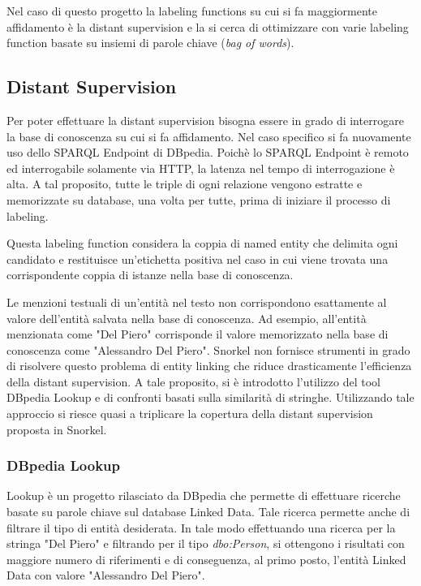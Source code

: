 Nel caso di questo progetto la labeling functions su cui si fa maggiormente affidamento è la distant supervision e la si cerca di ottimizzare con varie labeling function basate su insiemi di parole chiave (\textit{bag of words}).

\subsection{Distant Supervision}
\label{sec:methods:labelling:distant_supervision}
Per poter effettuare la distant supervision bisogna essere in grado di interrogare la base di conoscenza su cui si fa affidamento. Nel caso specifico si fa nuovamente uso dello SPARQL Endpoint di DBpedia. Poichè lo SPARQL Endpoint è remoto ed interrogabile solamente via HTTP, la latenza nel tempo di interrogazione è alta. A tal proposito, tutte le triple di ogni relazione vengono estratte e memorizzate su database, una volta per tutte, prima di iniziare il processo di labeling.

Questa labeling function considera la coppia di named entity che delimita ogni candidato e restituisce un'etichetta positiva nel caso in cui viene trovata una corrispondente coppia di istanze nella base di conoscenza. 

Le menzioni testuali di un'entità nel testo non corrispondono esattamente al valore dell'entità salvata nella base di conoscenza. Ad esempio, all'entità menzionata come "Del Piero" corrisponde il valore memorizzato nella base di conoscenza come "Alessandro Del Piero". Snorkel non fornisce strumenti in grado di risolvere questo problema di entity linking che riduce drasticamente l'efficienza della distant supervision. A tale proposito, si è introdotto l'utilizzo del tool DBpedia Lookup e di confronti basati sulla similarità di stringhe. Utilizzando tale approccio si riesce quasi a triplicare la copertura della distant supervision proposta in Snorkel.

\subsubsection{DBpedia Lookup}
\label{sec:methods:labelling:distant_supervision:lookup}

Lookup è un progetto rilasciato da DBpedia che permette di effettuare ricerche basate su parole chiave sul database Linked Data. Tale ricerca permette anche di filtrare il tipo di entità desiderata. In tale modo effettuando una ricerca per la stringa "Del Piero" e filtrando per il tipo \textit{dbo:Person}, si ottengono i risultati con maggiore numero di riferimenti e di conseguenza, al primo posto, l'entità Linked Data con valore "Alessandro Del Piero". 

